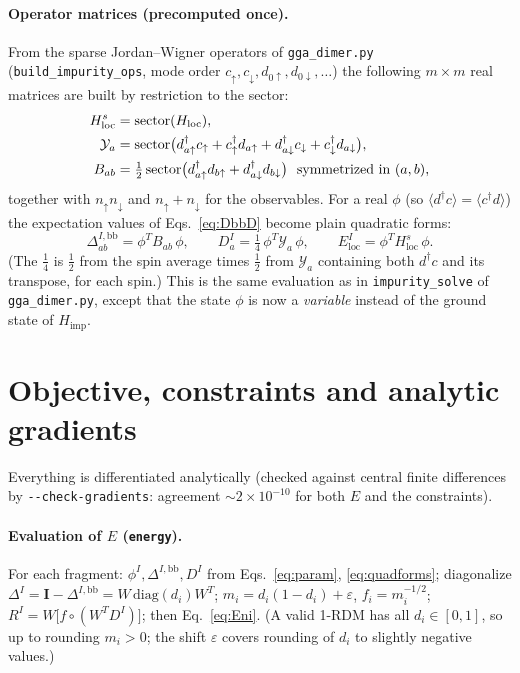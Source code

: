 \documentclass[11pt]{article}
\newcommand{\Himp}{H_{\mathrm{imp}}}
\newcommand{\Hloc}{H_{\mathrm{loc}}}
\newcommand{\Ybb}{\Delta^{I,\mathrm{bb}}}
\begin{document}
\paragraph{Operator matrices (precomputed once).} From the sparse Jordan--Wigner operators
of \texttt{gga\_dimer.py} (\texttt{build\_impurity\_ops}, mode order $c_\uparrow,c_\downarrow,
d_{0\uparrow},d_{0\downarrow},\dots$) the following $m\times m$ real matrices are built by
restriction to the sector:
\begin{align}
  H_{\mathrm{loc}}^{s}&=\text{sector}(\Hloc),\notag\\
  \mathcal Y_{a}&=\text{sector}\bigl(d^{\dagger}_{a\uparrow}c_{\uparrow}+c^{\dagger}_{\uparrow}d_{a\uparrow}
        +d^{\dagger}_{a\downarrow}c_{\downarrow}+c^{\dagger}_{\downarrow}d_{a\downarrow}\bigr),\notag\\
  B_{ab}&=\tfrac12\,\text{sector}\bigl(d^{\dagger}_{a\uparrow}d_{b\uparrow}
        +d^{\dagger}_{a\downarrow}d_{b\downarrow}\bigr)\ \ \text{symmetrized in }(a,b),
  \label{eq:opmats}
\end{align}
together with $n_\uparrow n_\downarrow$ and $n_\uparrow+n_\downarrow$ for the observables.
For a real $\phi$ (so $\langle d^\dagger c\rangle=\langle c^\dagger d\rangle$) the
expectation values of Eqs.~\eqref{eq:DbbD} become plain quadratic forms:
\begin{equation}
  \Ybb_{ab}=\phi^{T}B_{ab}\,\phi,\qquad
  D^{I}_{a}=\tfrac14\,\phi^{T}\mathcal Y_{a}\,\phi,\qquad
  E^{I}_{\mathrm{loc}}=\phi^{T}H^{s}_{\mathrm{loc}}\,\phi .
  \label{eq:quadforms}
\end{equation}
(The $\tfrac14$ is $\tfrac12$ from the spin average times $\tfrac12$ from $\mathcal Y_a$
containing both $d^\dagger c$ and its transpose, for each spin.) This is the same
evaluation as in \texttt{impurity\_solve} of \texttt{gga\_dimer.py}, except that the state
$\phi$ is now a \emph{variable} instead of the ground state of $\Himp$.

\section{Objective, constraints and analytic gradients}
\label{sec:gradients}

Everything is differentiated analytically (checked against central finite differences by
\texttt{-{}-check-gradients}: agreement $\sim2\times10^{-10}$ for both $E$ and the constraints).

\paragraph{Evaluation of $E$ (\texttt{energy}).} For each fragment: $\phi^I,\Ybb,D^I$ from
Eqs.~\eqref{eq:param}, \eqref{eq:quadforms}; diagonalize $\Delta^I=\mathbf I-\Ybb=W\,\mathrm{diag}(d_i)W^{T}$;
$m_i=d_i(1-d_i)+\varepsilon$, $f_i=m_i^{-1/2}$;
$R^{I}=W\bigl[f\circ(W^{T}D^{I})\bigr]$; then Eq.~\eqref{eq:Eni}. (A valid 1-RDM has all
$d_i\in[0,1]$, so up to rounding $m_i>0$; the shift $\varepsilon$ covers rounding of $d_i$ to slightly negative values.)
\end{document}
